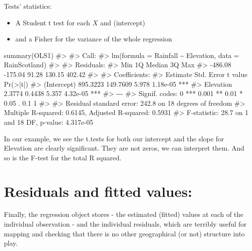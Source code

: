 \documentclass[
  letterpaper,
  DIV=11,
  numbers=noendperiod]{scrreprt}
\newenvironment{Shaded}{\begin{snugshade}}{\end{snugshade}}
\newcommand{\CommentTok}[1]{\textcolor[rgb]{0.37,0.37,0.37}{#1}}
\newcommand{\FunctionTok}[1]{\textcolor[rgb]{0.28,0.35,0.67}{#1}}
\newcommand{\NormalTok}[1]{\textcolor[rgb]{0.00,0.23,0.31}{#1}}
\providecommand{\tightlist}{%
  \setlength{\itemsep}{0pt}\setlength{\parskip}{0pt}}\usepackage{longtable,booktabs,array}
\begin{document}
Tests' statistics:

\begin{itemize}
\tightlist
\item
  A Student t test for each \(X\) and (intercept)
\item
  and a Fisher for the variance of the whole regression
\end{itemize}

\begin{Shaded}
\begin{Highlighting}[]
\FunctionTok{summary}\NormalTok{(OLS1)}
\CommentTok{\#\textgreater{} }
\CommentTok{\#\textgreater{} Call:}
\CommentTok{\#\textgreater{} lm(formula = Rainfall \textasciitilde{} Elevation, data = RainScotland)}
\CommentTok{\#\textgreater{} }
\CommentTok{\#\textgreater{} Residuals:}
\CommentTok{\#\textgreater{}     Min      1Q  Median      3Q     Max }
\CommentTok{\#\textgreater{} {-}486.08 {-}175.04   91.28  130.15  402.42 }
\CommentTok{\#\textgreater{} }
\CommentTok{\#\textgreater{} Coefficients:}
\CommentTok{\#\textgreater{}             Estimate Std. Error t value Pr(\textgreater{}|t|)    }
\CommentTok{\#\textgreater{} (Intercept) 895.3223   149.7609   5.978 1.18e{-}05 ***}
\CommentTok{\#\textgreater{} Elevation     2.3774     0.4438   5.357 4.32e{-}05 ***}
\CommentTok{\#\textgreater{} {-}{-}{-}}
\CommentTok{\#\textgreater{} Signif. codes:  0 \textquotesingle{}***\textquotesingle{} 0.001 \textquotesingle{}**\textquotesingle{} 0.01 \textquotesingle{}*\textquotesingle{} 0.05 \textquotesingle{}.\textquotesingle{} 0.1 \textquotesingle{} \textquotesingle{} 1}
\CommentTok{\#\textgreater{} }
\CommentTok{\#\textgreater{} Residual standard error: 242.8 on 18 degrees of freedom}
\CommentTok{\#\textgreater{} Multiple R{-}squared:  0.6145, Adjusted R{-}squared:  0.5931 }
\CommentTok{\#\textgreater{} F{-}statistic:  28.7 on 1 and 18 DF,  p{-}value: 4.317e{-}05}
\end{Highlighting}
\end{Shaded}

In our example, we see the t.tests for both our intercept and the slope
for Elevation are clearly significant. They are not zeros, we can
interpret them. And so is the F-test for the total R squared.

\section{Residuals and fitted
values:}\label{residuals-and-fitted-values}

Finally, the regression object stores - the estimated (fitted) values at
each of the individual observation - and the individual residuals, which
are terribly useful for mapping and checking that there is no other
geographical (or not) structure into play.
\end{document}
